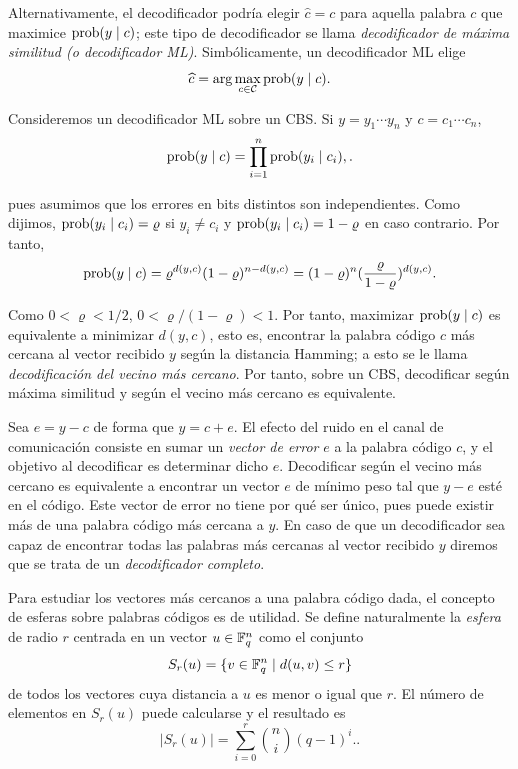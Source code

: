 Alternativamente, el decodificador podría elegir \(\widehat{c} = c\) para aquella palabra \(c\) que maximice \(\operatorname{prob}(y \mid c)\); este tipo de decodificador se llama \textit{decodificador de máxima similitud (o decodificador ML)}. Simbólicamente, un decodificador ML elige
\[
\widehat{c} = \arg \max_{c \in \mathcal{C}} \operatorname{prob}(y \mid c)
.\]

Consideremos un decodificador ML sobre un CBS. Si  \(y =y_1 \cdots y_n\) y \(c = c_1 \cdots c_n\),
\[
\operatorname{prob} (y \mid c) = \prod_{i=1}^{n} \operatorname{prob}(y_i \mid c_i),
.\]

pues asumimos que los errores en bits distintos son independientes. Como dijimos, \(\operatorname{prob} (y_i \mid c_i) = \varrho\) si  \(y_i \neq c_i\) y \(\operatorname{prob}(y_i \mid c_i) = 1 - \varrho\) en caso contrario. Por tanto,
\[
\operatorname{prob}(y \mid c) = \varrho^{d(y,c)}(1 - \varrho)^{n - d(y,c)} = (1 - \varrho)^{n}(\frac{\varrho}{1 - \varrho})^{d(y,c)}
.\]

Como \(0 < \varrho < 1 / 2\),  \(0 < \varrho / (1 - \varrho) < 1\). Por tanto, maximizar \(\operatorname{prob}(y \mid c)\) es equivalente a minimizar \(d(y,c)\), esto es, encontrar la palabra código \(c\) más cercana al vector recibido \(y\) según la distancia Hamming; a esto se le llama \textit{decodificación del vecino más cercano}. Por tanto, sobre un CBS, decodificar según máxima similitud y según el vecino más cercano es equivalente.

Sea \(e = y-c\) de forma que \(y = c + e\). El efecto del ruido en el canal de comunicación consiste en sumar un \textit{vector de error} \(e\) a la palabra código \(c\), y el objetivo al decodificar es determinar dicho \(e\). Decodificar según el vecino más cercano es equivalente a encontrar un vector \(e\) de mínimo peso tal que \(y -e \) esté en el código. Este vector de error no tiene por qué ser único, pues puede existir más de una palabra código más cercana a \(y\). En caso de que un decodificador sea capaz de encontrar todas las palabras más cercanas al vector recibido \(y\) diremos que se trata de un \textit{decodificador completo}.

Para estudiar los vectores más cercanos a una palabra código dada, el concepto de esferas sobre palabras códigos es de utilidad. Se define naturalmente la \textit{esfera} de radio \(r\) centrada en un vector \(u \in \mathbb{F}_q^{n}\) como el conjunto
\[
S_r(u) = \{v \in \mathbb{F}_q^{n} \mid d(u,v) \le r\}
\]
de todos los vectores cuya distancia a \(u\) es menor o igual que  \(r\). El número de elementos en \(S_r(u)\) puede calcularse y el resultado es
 \[
|S_r(u)| = \sum_{i=0}^{r} \binom{n}{i} (q - 1)^{i}.
.\]

